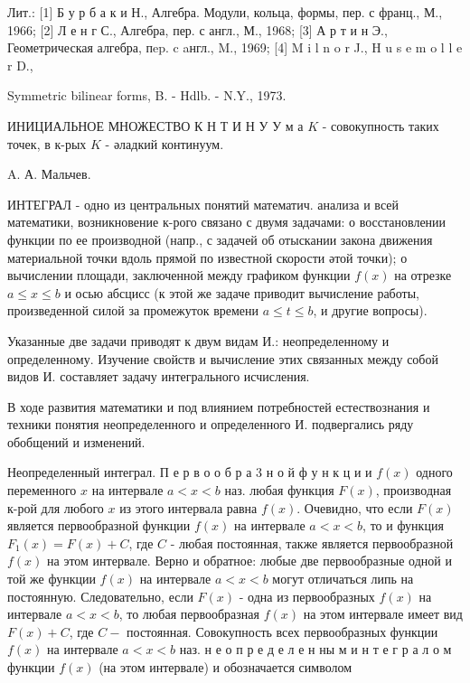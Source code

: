 \documentclass[10pt]{article}
\begin{document}
Лит.: [1] Б у р б а к и Н., Алгебра. Модули, кольца, формы, пер. с франц., М., 1966; [2] Л е н г С., Алгебра, пер. с англ., М., 1968; [3] А р т и н Э., Геометрическая алгебра, пep. c aнгл., M., 1969; [4] M i l n o r J., H u s e m o l l e r D.,

Symmetric bilinear forms, B. - Hdlb. - N.Y., 1973.



ИНИЦИАЛЬНОЕ МНОЖЕСТВО К Н Т И Н У У м а $K$ - совокупность таких точек, в к-рых $K$ - әладкий континуум.



A. А. Мальчев.



ИНТЕГРАЛ - одно из центральных понятий математич. анализа и всей математики, возникновение к-рого связано с двумя задачами: о восстановлении функции по ее производной (напр., с задачей об отыскании закона движения материальной точки вдоль прямой по известной скорости әтой точки); о вычислении площади, заключенной между графиком функции $f(x)$ на отрезке $a \leqslant x \leqslant b$ и осью абсцисс (к этой же задаче приводит вычисление работы, произведенной силой за промежуток времени $a \leqslant t \leqslant b$, и другие вопросы).



Указанные две задачи приводят к двум видам И.: неопределенному и определенному. Изучение свойств и вычисление этих связанных между собой видов И. составляет задачу интегрального исчисления.



В ходе развития математики и под влиянием потребностей естествознания и техники понятия неопределенного и определенного И. подвергались ряду обобщений и изменений.



Неопределенный интеграл. П е р в о о б р а 3 н о й $ф$ у н к ц и и $f(x)$ одного переменного $x$ на интервале $a<x<b$ наз. любая функция $F(x)$, производная к-рой для любого $x$ из этого интервала равна $f(x)$. Очевидно, что если $F(x)$ является первообразной функции $f(x)$ на интервале $a<x<b$, то и функция $F_{1}(x)=F(x)+C$, где $C$ - любая постоянная, также является первообразной $f(x)$ на этом интервале. Верно и обратное: любые две первообразные одной и той же функции $f(x)$ на интервале $a<x<b$ могут отличаться липь на постоянную. Следовательно, если $F(x)$ - одна из первообразных $f(x)$ на интервале $a<x<b$, то любая первообразная $f(x)$ на этом интервале имеет вид $F(x)+C$, где $C-$ постоянная. Совокупность всех первообразных функции $f(x)$ на интервале $a<x<b$ наз. н е о п р е д е л е н ны м и н т е г р а л о м функции $f(x)$ (на этом интервале) и обозначается символом
\end{document}
